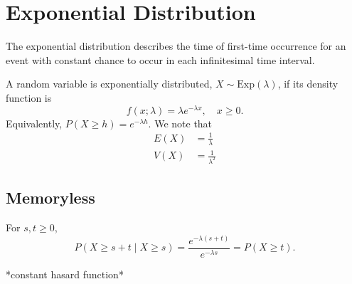 \documentclass{article}
\begin{document}
 
 \section{Exponential Distribution}
 The exponential distribution describes the time of first-time occurrence for an event with constant chance to occur in each infinitesimal time interval.
 
 A random variable is exponentially distributed, $X \sim \textrm{Exp}(\lambda)$, if its density function is
 \begin{equation*}
 f(x;\lambda) = \lambda e^{-\lambda x}, \quad x \geq 0.
 \end{equation*}
 Equivalently, $P(X \geq h) = e^{-\lambda h}$. We note that
 \begin{equation}
 \begin{split}
 E(X) &= \frac{1}{\lambda} \\
 V(X) &= \frac{1}{\lambda^2}
 \end{split}
 \end{equation} 
 
 \subsection{Memoryless}
 For $s, t \geq 0$, 
 \begin{equation*}
 P(X \geq s + t \mid X \geq s) = \frac{e^{-\lambda (s+t)}}{e^{-\lambda s}} = P(X \geq t).
 \end{equation*}
 
 	
 
 
 *constant hasard function*
\end{document}
